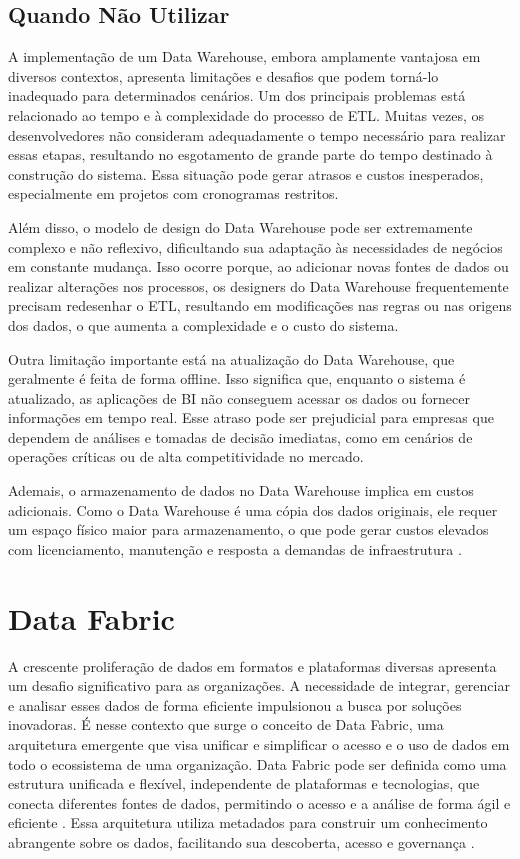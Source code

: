 \subsection{Quando Não Utilizar}
A implementação de um Data Warehouse, embora amplamente vantajosa em diversos contextos, apresenta limitações e desafios que podem torná-lo 
inadequado para determinados cenários. Um dos principais problemas está relacionado ao tempo e à complexidade do processo de ETL. Muitas vezes, 
os desenvolvedores não consideram adequadamente o tempo necessário para realizar essas etapas, resultando no esgotamento de grande parte do 
tempo destinado à construção do sistema. Essa situação pode gerar atrasos e custos inesperados, especialmente em projetos com cronogramas restritos.

Além disso, o modelo de design do Data Warehouse pode ser extremamente complexo e não reflexivo, dificultando sua adaptação às necessidades de 
negócios em constante mudança. Isso ocorre porque, ao adicionar novas fontes de dados ou realizar alterações nos processos, os designers do Data 
Warehouse frequentemente precisam redesenhar o ETL, resultando em modificações nas regras ou nas origens dos dados, o que aumenta a complexidade 
e o custo do sistema.

Outra limitação importante está na atualização do Data Warehouse, que geralmente é feita de forma offline. Isso significa que, enquanto o sistema 
é atualizado, as aplicações de BI não conseguem acessar os dados ou fornecer informações em tempo real. Esse atraso pode ser prejudicial para empresas 
que dependem de análises e tomadas de decisão imediatas, como em cenários de operações críticas ou de alta competitividade no mercado.

Ademais, o armazenamento de dados no Data Warehouse implica em custos adicionais. Como o Data Warehouse é uma cópia dos dados originais, ele requer um 
espaço físico maior para armazenamento, o que pode gerar custos elevados com licenciamento, manutenção e resposta a demandas de infraestrutura \cite{mousa2015data}. 

\section{Data Fabric}

A crescente proliferação de dados em formatos e plataformas diversas apresenta um desafio significativo para as organizações. A necessidade de integrar, gerenciar e
analisar esses dados de forma eficiente impulsionou a busca por soluções inovadoras. É nesse contexto que surge o conceito de Data Fabric, uma arquitetura emergente 
que visa unificar e simplificar o acesso e o uso de dados em todo o ecossistema de uma organização.
Data Fabric pode ser definida como uma estrutura unificada e flexível, independente de plataformas e tecnologias, que conecta diferentes fontes de dados, permitindo 
o acesso e a análise de forma ágil e eficiente \cite{gade2024data}. Essa arquitetura utiliza metadados para construir um conhecimento abrangente sobre os dados, 
facilitando sua descoberta, acesso e governança \cite{barik2022data}.

